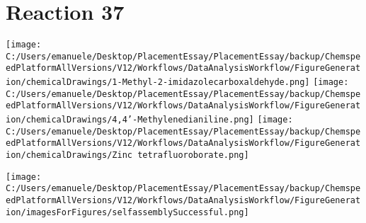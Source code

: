 \documentclass{article}%
\begin{document}
\section*{Reaction 37}%
%
\begin{scheme}[H]%
\begin{minipage}{0.5\textwidth}%
\texttt{[image: C:/Users/emanuele/Desktop/PlacementEssay/PlacementEssay/backup/ChemspeedPlatformAllVersions/V12/Workflows/DataAnalysisWorkflow/FigureGeneration/chemicalDrawings/1-Methyl-2-imidazolecarboxaldehyde.png]}%
\texttt{[image: C:/Users/emanuele/Desktop/PlacementEssay/PlacementEssay/backup/ChemspeedPlatformAllVersions/V12/Workflows/DataAnalysisWorkflow/FigureGeneration/chemicalDrawings/4,4'-Methylenedianiline.png]}%
\texttt{[image: C:/Users/emanuele/Desktop/PlacementEssay/PlacementEssay/backup/ChemspeedPlatformAllVersions/V12/Workflows/DataAnalysisWorkflow/FigureGeneration/chemicalDrawings/Zinc tetrafluoroborate.png]}%
\end{minipage}%
\begin{minipage}{0.5\textwidth}%
\begin{center}%
\texttt{[image: C:/Users/emanuele/Desktop/PlacementEssay/PlacementEssay/backup/ChemspeedPlatformAllVersions/V12/Workflows/DataAnalysisWorkflow/FigureGeneration/imagesForFigures/selfassemblySuccessful.png]}%
\end{center}%
\end{minipage}%
\caption{Self-assembly of components 12, 17, with Zinc(II) in a 3.0:1.5:1.0 molar ratio in CH$_3$CN at 60\textdegree C for 40h. These are the reagents (starting materials) for reaction 37.}%
\end{scheme}%
\end{document}
